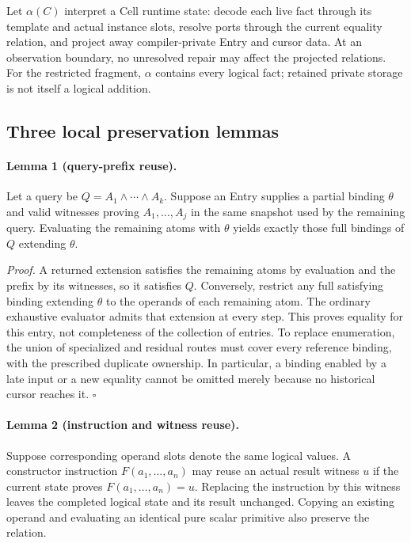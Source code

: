 Let $\alpha(C)$ interpret a Cell runtime state: decode each live fact through its
template and actual instance slots, resolve ports through the current equality
relation, and project away compiler-private Entry and cursor data. At an
observation boundary, no unresolved repair may affect the projected relations.
For the restricted fragment, $\alpha$ contains every logical fact; retained
private storage is not itself a logical addition.

\subsection{Three local preservation lemmas}
\paragraph{Lemma 1 (query-prefix reuse).}
Let a query be $Q=A_1\land\cdots\land A_k$. Suppose an Entry supplies a partial
binding $\theta$ and valid witnesses proving $A_1,\ldots,A_j$ in the same snapshot
used by the remaining query. Evaluating the remaining atoms with $\theta$ yields
exactly those full bindings of $Q$ extending $\theta$.

\emph{Proof.} A returned extension satisfies the remaining atoms by evaluation
and the prefix by its witnesses, so it satisfies $Q$. Conversely, restrict any
full satisfying binding extending $\theta$ to the operands of each remaining
atom. The ordinary exhaustive evaluator admits that extension at every step.
This proves equality for this entry, not completeness of the collection of
entries. To replace enumeration, the union of specialized and residual routes
must cover every reference binding, with the prescribed duplicate ownership.
In particular, a binding enabled by a late input or a new equality cannot be
omitted merely because no historical cursor reaches it. $\square$

\paragraph{Lemma 2 (instruction and witness reuse).}
Suppose corresponding operand slots denote the same logical values. A constructor
instruction $F(a_1,\ldots,a_n)$ may reuse an actual result witness $u$ if the
current state proves $F(a_1,\ldots,a_n)=u$. Replacing the instruction by this
witness leaves the completed logical state and its result unchanged. Copying an
existing operand and evaluating an identical pure scalar primitive also preserve
the relation.

